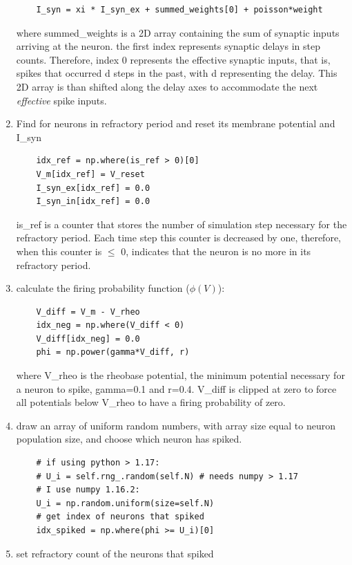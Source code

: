 \documentclass[11pt]{scrartcl}
\begin{document}
\begin{enumerate}
\begin{verbatim}
    I_syn = xi * I_syn_ex + summed_weights[0] + poisson*weight
\end{verbatim}
where summed\_weights is a 2D array containing the sum of synaptic inputs arriving at the neuron. the first index represents synaptic delays in step counts. Therefore, index 0 represents the effective synaptic inputs, that is, spikes that occurred d steps in the past, with d representing the delay. This 2D array is than shifted along the delay axes to accommodate the next \textit{effective} spike inputs.
    \item Find for neurons in refractory period and reset its membrane potential and I\_syn
\begin{verbatim}
    idx_ref = np.where(is_ref > 0)[0]
    V_m[idx_ref] = V_reset
    I_syn_ex[idx_ref] = 0.0
    I_syn_in[idx_ref] = 0.0
\end{verbatim}
is\_ref is a counter that stores the number of simulation step necessary for the refractory period. Each time step this counter is decreased by one, therefore, when this counter is $\leq$ 0, indicates that the neuron is no more in its refractory period.
    \item calculate the firing probability function ($\phi(V)$):
\begin{verbatim}
    V_diff = V_m - V_rheo
    idx_neg = np.where(V_diff < 0)
    V_diff[idx_neg] = 0.0
    phi = np.power(gamma*V_diff, r)
\end{verbatim}
where V\_rheo is the rheobase potential, the minimum potential necessary for a neuron to spike, gamma=0.1 and r=0.4. V\_diff is clipped at zero to force all potentials below V\_rheo to have a firing probability of zero.
    \item draw an array of uniform random numbers, with array size equal to neuron population size, and choose which neuron has spiked.
\begin{verbatim}
    # if using python > 1.17:
    # U_i = self.rng_.random(self.N) # needs numpy > 1.17
    # I use numpy 1.16.2:
    U_i = np.random.uniform(size=self.N)
    # get index of neurons that spiked
    idx_spiked = np.where(phi >= U_i)[0]
\end{verbatim}
    \item set refractory count of the neurons that spiked
\begin{verbatim}

\end{verbatim}
\end{enumerate}
\end{document}
